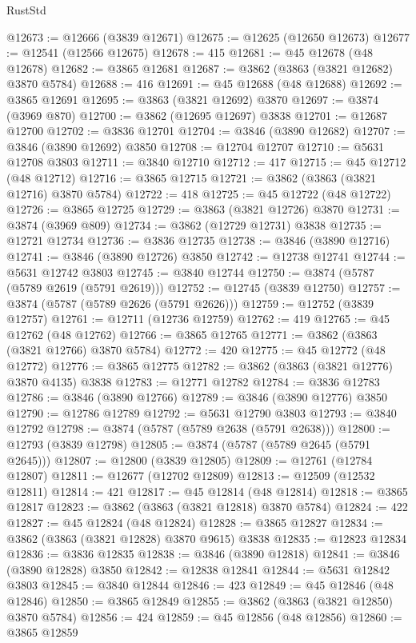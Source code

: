 \begin{lexlean}{RustStd}
\begin{coremodule}
@12673 := @12666 (@3839 @12671)
@12675 := @12625 (@12650 @12673)
@12677 := @12541 (@12566 @12675)
@12678 := 415
@12681 := @45 @12678 (@48 @12678)
@12682 := @3865 @12681
@12687 := @3862 (@3863 (@3821 @12682) @3870 @5784)
@12688 := 416
@12691 := @45 @12688 (@48 @12688)
@12692 := @3865 @12691
@12695 := @3863 (@3821 @12692) @3870
@12697 := @3874 (@3969 @870)
@12700 := @3862 (@12695 @12697) @3838
@12701 := @12687 @12700
@12702 := @3836 @12701
@12704 := @3846 (@3890 @12682)
@12707 := @3846 (@3890 @12692) @3850
@12708 := @12704 @12707
@12710 := @5631 @12708 @3803
@12711 := @3840 @12710
@12712 := 417
@12715 := @45 @12712 (@48 @12712)
@12716 := @3865 @12715
@12721 := @3862 (@3863 (@3821 @12716) @3870 @5784)
@12722 := 418
@12725 := @45 @12722 (@48 @12722)
@12726 := @3865 @12725
@12729 := @3863 (@3821 @12726) @3870
@12731 := @3874 (@3969 @809)
@12734 := @3862 (@12729 @12731) @3838
@12735 := @12721 @12734
@12736 := @3836 @12735
@12738 := @3846 (@3890 @12716)
@12741 := @3846 (@3890 @12726) @3850
@12742 := @12738 @12741
@12744 := @5631 @12742 @3803
@12745 := @3840 @12744
@12750 := @3874 (@5787 (@5789 @2619 (@5791 @2619)))
@12752 := @12745 (@3839 @12750)
@12757 := @3874 (@5787 (@5789 @2626 (@5791 @2626)))
@12759 := @12752 (@3839 @12757)
@12761 := @12711 (@12736 @12759)
@12762 := 419
@12765 := @45 @12762 (@48 @12762)
@12766 := @3865 @12765
@12771 := @3862 (@3863 (@3821 @12766) @3870 @5784)
@12772 := 420
@12775 := @45 @12772 (@48 @12772)
@12776 := @3865 @12775
@12782 := @3862 (@3863 (@3821 @12776) @3870 @4135) @3838
@12783 := @12771 @12782
@12784 := @3836 @12783
@12786 := @3846 (@3890 @12766)
@12789 := @3846 (@3890 @12776) @3850
@12790 := @12786 @12789
@12792 := @5631 @12790 @3803
@12793 := @3840 @12792
@12798 := @3874 (@5787 (@5789 @2638 (@5791 @2638)))
@12800 := @12793 (@3839 @12798)
@12805 := @3874 (@5787 (@5789 @2645 (@5791 @2645)))
@12807 := @12800 (@3839 @12805)
@12809 := @12761 (@12784 @12807)
@12811 := @12677 (@12702 @12809)
@12813 := @12509 (@12532 @12811)
@12814 := 421
@12817 := @45 @12814 (@48 @12814)
@12818 := @3865 @12817
@12823 := @3862 (@3863 (@3821 @12818) @3870 @5784)
@12824 := 422
@12827 := @45 @12824 (@48 @12824)
@12828 := @3865 @12827
@12834 := @3862 (@3863 (@3821 @12828) @3870 @9615) @3838
@12835 := @12823 @12834
@12836 := @3836 @12835
@12838 := @3846 (@3890 @12818)
@12841 := @3846 (@3890 @12828) @3850
@12842 := @12838 @12841
@12844 := @5631 @12842 @3803
@12845 := @3840 @12844
@12846 := 423
@12849 := @45 @12846 (@48 @12846)
@12850 := @3865 @12849
@12855 := @3862 (@3863 (@3821 @12850) @3870 @5784)
@12856 := 424
@12859 := @45 @12856 (@48 @12856)
@12860 := @3865 @12859

\end{coremodule}
\end{lexlean}
